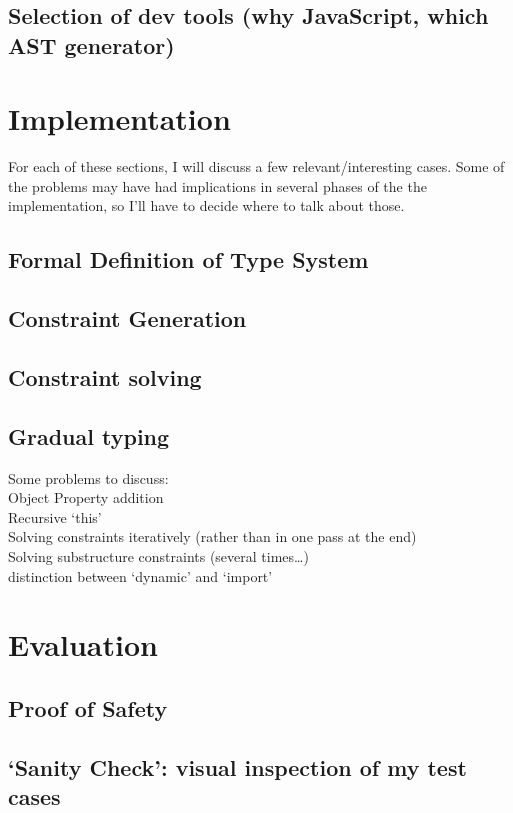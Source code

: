 \documentclass[12pt,a4paper,twoside,openright]{report}
\begin{document}
\section{Selection of dev tools (why JavaScript, which AST generator)}
\chapter{Implementation}\label{implementation}

For each of these sections, I will discuss a few relevant/interesting
cases. Some of the problems may have had implications in several
phases of the the implementation, so I'll have to decide where to talk
about those. 


\section{Formal Definition of Type System}
\section{Constraint Generation}
\section{Constraint solving}
\section{Gradual typing}
Some problems to discuss: \\
Object Property addition \\
Recursive `this' \\
Solving constraints iteratively (rather than in one pass at the end) \\
Solving substructure constraints (several times\ldots) \\
distinction between `dynamic' and `import' \\
\chapter{Evaluation}\label{evaluation}
\section{Proof of Safety}
\section{`Sanity Check': visual inspection of my test cases}
\end{document}
